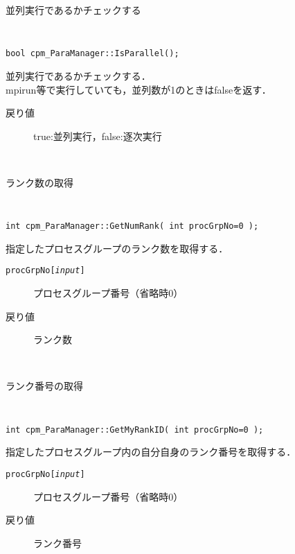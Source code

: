 \begin{spacing}{0.8}
\begin{itembox}[l]{並列実行であるかチェックする}
{\tt
\begin{verbatim}
bool cpm_ParaManager::IsParallel();
\end{verbatim}
}
並列実行であるかチェックする．\\
mpirun等で実行していても，並列数が1のときはfalseを返す．
\begin{description}
\item[戻り値] true:並列実行，false:逐次実行
\end{description}
\end{itembox}\\
\end{spacing}

\begin{spacing}{0.8}
\begin{itembox}[l]{ランク数の取得}
{\tt
\begin{verbatim}
int cpm_ParaManager::GetNumRank( int procGrpNo=0 );
\end{verbatim}
}
指定したプロセスグループのランク数を取得する．
\begin{description}
\item[{\tt procGrpNo[{\it input}]}] プロセスグループ番号（省略時0）
\\
\item[戻り値] ランク数
\end{description}
\end{itembox}\\
\end{spacing}

\begin{spacing}{0.8}
\begin{itembox}[l]{ランク番号の取得}
{\tt
\begin{verbatim}
int cpm_ParaManager::GetMyRankID( int procGrpNo=0 );
\end{verbatim}
}
指定したプロセスグループ内の自分自身のランク番号を取得する．
\begin{description}
\item[{\tt procGrpNo[{\it input}]}] プロセスグループ番号（省略時0）
\\
\item[戻り値] ランク番号
\end{description}
\end{itembox}\\
\end{spacing}

